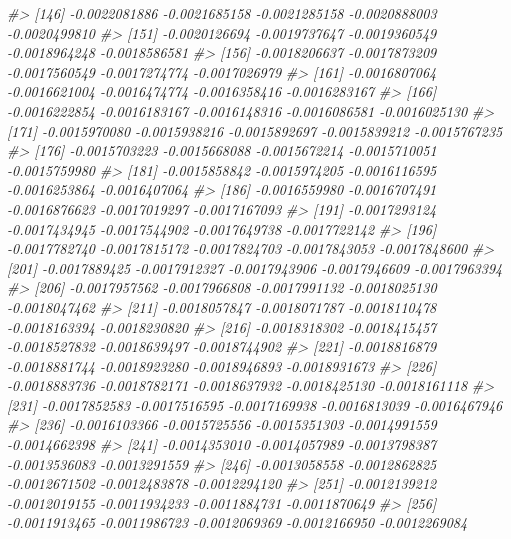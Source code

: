 \documentclass[
]{article}
\newenvironment{Shaded}{\begin{snugshade}}{\end{snugshade}}
\newcommand{\CommentTok}[1]{\textcolor[rgb]{0.56,0.35,0.01}{\textit{#1}}}
\begin{document}
\begin{Shaded}
\begin{Highlighting}[]
\CommentTok{\#\textgreater{} [146] {-}0.0022081886 {-}0.0021685158 {-}0.0021285158 {-}0.0020888003 {-}0.0020499810}
\CommentTok{\#\textgreater{} [151] {-}0.0020126694 {-}0.0019737647 {-}0.0019360549 {-}0.0018964248 {-}0.0018586581}
\CommentTok{\#\textgreater{} [156] {-}0.0018206637 {-}0.0017873209 {-}0.0017560549 {-}0.0017274774 {-}0.0017026979}
\CommentTok{\#\textgreater{} [161] {-}0.0016807064 {-}0.0016621004 {-}0.0016474774 {-}0.0016358416 {-}0.0016283167}
\CommentTok{\#\textgreater{} [166] {-}0.0016222854 {-}0.0016183167 {-}0.0016148316 {-}0.0016086581 {-}0.0016025130}
\CommentTok{\#\textgreater{} [171] {-}0.0015970080 {-}0.0015938216 {-}0.0015892697 {-}0.0015839212 {-}0.0015767235}
\CommentTok{\#\textgreater{} [176] {-}0.0015703223 {-}0.0015668088 {-}0.0015672214 {-}0.0015710051 {-}0.0015759980}
\CommentTok{\#\textgreater{} [181] {-}0.0015858842 {-}0.0015974205 {-}0.0016116595 {-}0.0016253864 {-}0.0016407064}
\CommentTok{\#\textgreater{} [186] {-}0.0016559980 {-}0.0016707491 {-}0.0016876623 {-}0.0017019297 {-}0.0017167093}
\CommentTok{\#\textgreater{} [191] {-}0.0017293124 {-}0.0017434945 {-}0.0017544902 {-}0.0017649738 {-}0.0017722142}
\CommentTok{\#\textgreater{} [196] {-}0.0017782740 {-}0.0017815172 {-}0.0017824703 {-}0.0017843053 {-}0.0017848600}
\CommentTok{\#\textgreater{} [201] {-}0.0017889425 {-}0.0017912327 {-}0.0017943906 {-}0.0017946609 {-}0.0017963394}
\CommentTok{\#\textgreater{} [206] {-}0.0017957562 {-}0.0017966808 {-}0.0017991132 {-}0.0018025130 {-}0.0018047462}
\CommentTok{\#\textgreater{} [211] {-}0.0018057847 {-}0.0018071787 {-}0.0018110478 {-}0.0018163394 {-}0.0018230820}
\CommentTok{\#\textgreater{} [216] {-}0.0018318302 {-}0.0018415457 {-}0.0018527832 {-}0.0018639497 {-}0.0018744902}
\CommentTok{\#\textgreater{} [221] {-}0.0018816879 {-}0.0018881744 {-}0.0018923280 {-}0.0018946893 {-}0.0018931673}
\CommentTok{\#\textgreater{} [226] {-}0.0018883736 {-}0.0018782171 {-}0.0018637932 {-}0.0018425130 {-}0.0018161118}
\CommentTok{\#\textgreater{} [231] {-}0.0017852583 {-}0.0017516595 {-}0.0017169938 {-}0.0016813039 {-}0.0016467946}
\CommentTok{\#\textgreater{} [236] {-}0.0016103366 {-}0.0015725556 {-}0.0015351303 {-}0.0014991559 {-}0.0014662398}
\CommentTok{\#\textgreater{} [241] {-}0.0014353010 {-}0.0014057989 {-}0.0013798387 {-}0.0013536083 {-}0.0013291559}
\CommentTok{\#\textgreater{} [246] {-}0.0013058558 {-}0.0012862825 {-}0.0012671502 {-}0.0012483878 {-}0.0012294120}
\CommentTok{\#\textgreater{} [251] {-}0.0012139212 {-}0.0012019155 {-}0.0011934233 {-}0.0011884731 {-}0.0011870649}
\CommentTok{\#\textgreater{} [256] {-}0.0011913465 {-}0.0011986723 {-}0.0012069369 {-}0.0012166950 {-}0.0012269084}

\end{Highlighting}
\end{Shaded}
\end{document}
